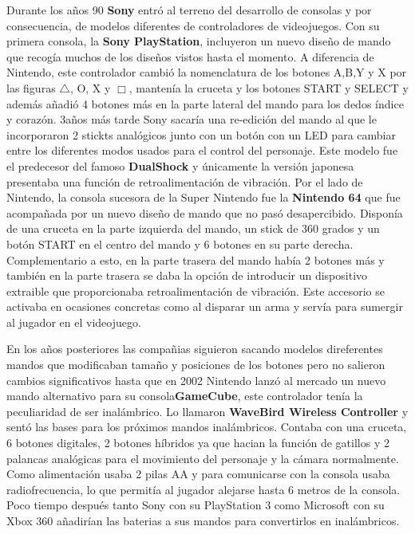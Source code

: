 Durante los a\~nos 90 \textbf{Sony} entr\'o al terreno del desarrollo de consolas y por consecuencia, de modelos diferentes de controladores de videojuegos. Con su primera consola, la \textbf{Sony PlayStation}, incluyeron un nuevo dise\~no de mando que recog\'ia muchos de los dise\~nos vistos hasta el momento. A diferencia de Nintendo, este controlador cambi\'o la nomenclatura de los botones A,B,Y y X por las figuras $\triangle$, O, X y $\Box$, manten\'ia la cruceta y los botones START y SELECT y adem\'as a\~nadi\'o 4 botones m\'as en la parte lateral del mando para los dedos \'indice y coraz\'on. 3a\~nos m\'as tarde Sony sacar\'ia una re-edici\'on del mando al que le incorporaron 2 stickts anal\'ogicos junto con un bot\'on con un LED para cambiar entre los diferentes modos usados para el control del personaje. Este modelo fue el predecesor del famoso \textbf{DualShock} y \'unicamente la versi\'on japonesa presentaba una funci\'on de retroalimentaci\'on de vibraci\'on. Por el lado de Nintendo, la consola sucesora de la Super Nintendo fue la \textbf{Nintendo 64} que fue acompa\~nada por un nuevo dise\~no de mando que no pas\'o desapercibido. Dispon\'ia de una cruceta en la parte izquierda del mando, un stick de 360 grados y un bot\'on START en el centro del mando y 6 botones en su parte derecha. Complementario a esto, en la parte trasera del mando hab\'ia 2 botones m\'as y tambi\'en en la parte trasera se daba la opci\'on de introducir un dispositivo extraible que proporcionaba retroalimentaci\'on de vibraci\'on. Este accesorio se activaba en ocasiones concretas como al disparar un arma y serv\'ia para sumergir al jugador en el videojuego.\par

En los a\~nos posteriores las compa\~nias siguieron sacando modelos direferentes mandos que modificaban tama\~no y posiciones de los botones pero no salieron cambios significativos hasta que en 2002 Nintendo lanz\'o al mercado un nuevo mando alternativo para su consola\textbf{GameCube}, este controlador ten\'ia la peculiaridad de ser inal\'ambrico. Lo llamaron \textbf{WaveBird Wireless Controller} y sent\'o las bases para los pr\'oximos mandos inal\'ambricos. Contaba con una cruceta, 6 botones digitales, 2 botones h\'ibridos ya que hacian la funci\'on de gatillos y 2 palancas anal\'ogicas para el movimiento del personaje y la c\'amara normalmente. Como alimentaci\'on usaba 2 pilas AA y para comunicarse con la consola usaba radiofrecuencia, lo que permit\'ia al jugador alejarse hasta 6 metros de la consola. Poco tiempo despu\'es tanto Sony con su PlayStation 3 como Microsoft con su Xbox 360 a\~nadir\'ian las baterias a sus mandos para convertirlos en inal\'ambricos. \par

